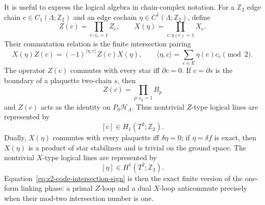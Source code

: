 It is useful to express the logical algebra in chain-complex notation.  For a
\(\mathbb Z_2\) edge chain \(c\in C_1(\Lambda;\mathbb Z_2)\) and an edge
cochain \(\eta\in C^1(\Lambda;\mathbb Z_2)\), define
\begin{equation}
  Z(c)=\prod_{e:c_e=1}Z_e,\qquad
  X(\eta)=\prod_{e:\eta(e)=1}X_e .
  \label{eq:z2-code-chain-operators}
\end{equation}
Their commutation relation is the finite intersection pairing
\begin{equation}
  X(\eta)Z(c)
  =
  (-1)^{\langle \eta,c\rangle}Z(c)X(\eta),
  \qquad
  \langle \eta,c\rangle=\sum_{e\in E}\eta(e)c_e\pmod 2 .
  \label{eq:z2-code-intersection-sign}
\end{equation}
The operator \(Z(c)\) commutes with every star iff \(\partial c=0\).  If
\(c=\partial s\) is the boundary of a plaquette two-chain \(s\), then
\[
  Z(c)=\prod_{p:s_p=1}B_p
\]
and \(Z(c)\) acts as the identity on \(P_0\mathcal H_\Lambda\).  Thus
nontrivial \(Z\)-type logical lines are represented by
\[
  [c]\in H_1(T^2;\mathbb Z_2).
\]
Dually, \(X(\eta)\) commutes with every plaquette iff \(\delta\eta=0\); if
\(\eta=\delta f\) is exact, then \(X(\eta)\) is a product of star
stabilizers and is trivial on the ground space.  The nontrivial \(X\)-type
logical lines are represented by
\[
  [\eta]\in H^1(T^2;\mathbb Z_2).
\]
Equation~\eqref{eq:z2-code-intersection-sign} is then the exact finite
version of the one-form linking phase: a primal \(Z\)-loop and a dual
\(X\)-loop anticommute precisely when their mod-two intersection number is
one.

